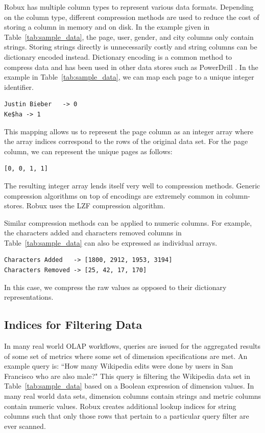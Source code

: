 \documentclass{sig-alternate-2013}
\begin{document}
Robux has multiple column types to represent various data formats. Depending on
the column type, different compression methods are used to reduce the cost of
storing a column in memory and on disk. In the example given in
Table~\ref{tab:sample_data}, the page, user, gender, and city columns only
contain strings. Storing strings directly is unnecessarily costly and string
columns can be dictionary encoded instead. Dictionary encoding is a common
method to compress data and has been used in other data stores such as
PowerDrill \cite{hall2012processing}. In the example in
Table~\ref{tab:sample_data}, we can map each page to a unique integer
identifier.
{\small\begin{verbatim}
Justin Bieber   -> 0
Ke$ha -> 1
\end{verbatim}}
This mapping allows us to represent the page column as an integer
array where the array indices correspond to the rows of the original
data set. For the page column, we can represent the unique
pages as follows:
{\small\begin{verbatim}
[0, 0, 1, 1]
\end{verbatim}}

The resulting integer array lends itself very well to
compression methods. Generic compression algorithms on top of encodings are
extremely common in column-stores. Robux uses the LZF \cite{liblzf2013} compression
algorithm.

Similar compression methods can be applied to numeric
columns. For example, the characters added and characters removed columns in
Table~\ref{tab:sample_data} can also be expressed as individual
arrays.
{\small\begin{verbatim}
Characters Added   -> [1800, 2912, 1953, 3194]
Characters Removed -> [25, 42, 17, 170]
\end{verbatim}}
In this case, we compress the raw values as opposed to their dictionary
representations.

\subsection{Indices for Filtering Data}
In many real world OLAP workflows, queries are issued for the aggregated
results of some set of metrics where some set of dimension specifications are
met. An example query is: ``How many Wikipedia edits were done by users in
San Francisco who are also male?" This query is filtering the Wikipedia data
set in Table~\ref{tab:sample_data} based on a Boolean expression of dimension
values. In many real world data sets, dimension columns contain strings and
metric columns contain numeric values. Robux creates additional lookup
indices for string columns such that only those rows that pertain to a
particular query filter are ever scanned.
\end{document}
